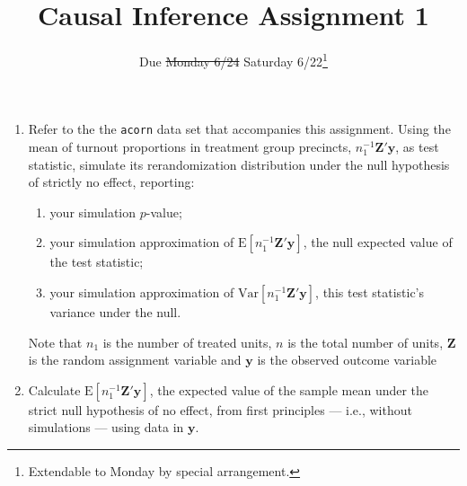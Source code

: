 \documentclass{article}
\title{Causal Inference Assignment 1}
\author{Due \st{Monday 6/24} Saturday 6/22\footnote{Extendable to
    Monday by special arrangement.}}
\begin{document}
\maketitle

\begin{enumerate}
\item Refer to the the \texttt{acorn} data set that accompanies this assignment.  Using the mean of turnout proportions in
treatment group precincts, $n_{1}^{-1}\mathbf{Z}'\mathbf{y}$, as
test statistic, simulate its rerandomization distribution under the
null hypothesis of strictly no effect, reporting: \label{q:simmoments}
\begin{enumerate}
  \item your simulation $p$-value; 
  \item your simulation approximation of $\mathrm{E}[
    n_{1}^{-1}\mathbf{Z}'\mathbf{y}]$, the null expected value of the test
    statistic; 
  \item your simulation approximation of
    $\mathrm{Var}[n_{1}^{-1}\mathbf{Z}'\mathbf{y}]$, this test
    statistic's variance under the null.
  \end{enumerate}
 Note that $n_1$ is the number of treated units, $n$ is the total number of units, $\mathbf{Z}$ is the random assignment variable and $\mathbf{y}$ is the observed outcome variable
\item Calculate $\mathrm{E} [ n_{1}^{-1}\mathbf{Z}'\mathbf{y} ]$, the expected value of the
  sample mean under the strict null hypothesis of no effect, from first principles --- i.e., without simulations ---  using data in $\mathbf{y}$.  \label{q:exactEV}

\end{enumerate}
\end{document}
